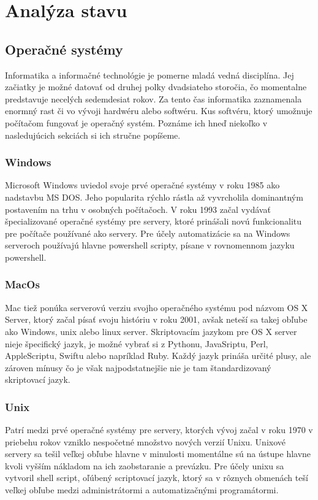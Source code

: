 \section{Analýza stavu}
\subsection{Operačné systémy}
\indent Informatika a informačné technológie je pomerne mladá vedná disciplína. Jej začiatky je možné datovať od druhej polky dvadsiateho storočia, čo momentalne predstavuje necelých sedemdesiat rokov. Za tento čas informatika zaznamenala enormný rast či vo vývoji hardwéru alebo softwéru. Kus softvéru, ktorý umožnuje počítačom fungovať je operačný systém. Poznáme ich hneď niekoľko v nasledujúcich sekciách si ich stručne popíšeme.
\subsubsection{Windows}
\indent Microsoft Windows uviedol svoje prvé operačné systémy v roku 1985 ako nadstavbu MS DOS. Jeho popularita rýchlo rástla až vyvrcholila dominantným postavením na trhu v osobných počítačoch. V roku 1993 začal vydávať špecializované operačné systémy pre servery, ktoré prinášali novú funkcionalitu pre počítače používané ako servery. Pre účely automatizácie sa na Windows serveroch používajú hlavne powershell scripty, písane v rovnomennom jazyku powershell.
\newline
\subsubsection{MacOs}
\indent  Mac tiež ponúka serverovú verziu svojho operačného systému pod názvom OS X Server, ktorý začal písať svoju históriu v roku 2001, avšak neteší sa takej obľube ako Windows, unix alebo linux server. Skriptovacím jazykom pre OS X server nieje špecifický jazyk, je možné vybrať si z Pythonu, JavaSriptu, Perl, AppleScriptu, Swiftu alebo napríklad Ruby. Každý jazyk prináša určité plusy, ale zároven mínusy čo je však najpodstatnejšie nie je tam štandardizovaný skriptovací jazyk.
\newline
\subsubsection{Unix}
\indent Patrí medzi prvé operačné systémy pre servery, ktorých vývoj začal v roku 1970 v priebehu rokov vzniklo nespočetné množstvo nových verzií Unixu. Unixové servery sa tešil veľkej obľube hlavne v minulosti momentálne sú na ústupe hlavne kvoli vyšším nákladom na ich zaobstaranie a prevázku. Pre účely unixu sa vytvoril shell script, oľúbený scriptovací jazyk, ktorý sa v rôznych obmenách teší veľkej obľube medzi administrátormi a automatizačnými programátormi.
\newline
